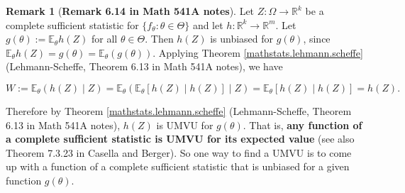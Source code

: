 \documentclass{article}
\newcommand{\E}{\mathbb{E}}
\theoremstyle{definition}
\newtheorem{theorem}{Theorem}
\theoremstyle{definition}
\theoremstyle{definition}
\theoremstyle{definition}
\theoremstyle{definition}
\newtheorem*{remark}{Remark}
\theoremstyle{definition}
\theoremstyle{definition}
\begin{document}
\begin{remark}[\textbf{Remark 6.14 in Math 541A notes}] Let \(Z: \Omega \to \mathbb{R}^k\) be a complete sufficient statistic for \(\{f_\theta: \theta \in \Theta\}\) and let \(h: \mathbb{R}^k \to \mathbb{R}^m\). Let \(g(\theta) := \E_\theta h(Z)\) for all \(\theta \in \Theta\). Then \(h(Z)\) is unbiased for \(g(\theta)\), since \(\E_\theta h(Z) = g(\theta) = \E_\theta (g(\theta)) \). Applying Theorem \ref{mathstats.lehmann.scheffe} (Lehmann-Scheffe, Theorem 6.13 in Math 541A notes), we have

\[
W := \E_\theta(h(Z) \mid Z) = \E_\theta ( \E_\theta[h(Z) \mid h(Z)] \mid Z ) =  \E_\theta[h(Z) \mid h(Z)] = h(Z).
\]

Therefore by Theorem \ref{mathstats.lehmann.scheffe} (Lehmann-Scheffe, Theorem 6.13 in Math 541A notes), \(h(Z)\) is UMVU for \(g(\theta)\). That is, \textbf{any function of a complete sufficient statistic is UMVU for its expected value} (see also Theorem 7.3.23 in Casella and Berger). So one way to find a UMVU is to come up with a function of a complete sufficient statistic that is unbiased for a given function \(g(\theta)\).

\end{remark}

%
%
%
%
%
%
%
\end{document}
